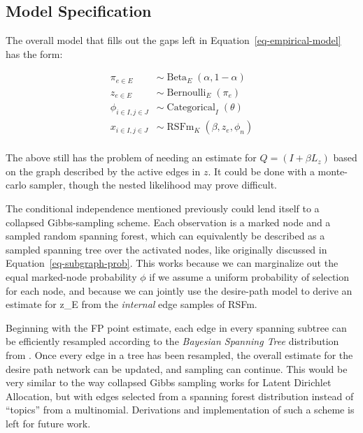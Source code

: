 \documentclass[%
	12pt,
		oneside,
		letterpaper
]{book}
\begin{document}
\subsection{Model Specification}\label{sec-lfa-gibbs}

The overall model that fills out the gaps left in
Equation~\ref{eq-empirical-model} has the form:

\[
\begin{aligned}
\pi_{e\in E} &\sim \operatorname{Beta}_E(\alpha, 1-\alpha)     \\
z_{e\in E} &\sim \operatorname{Bernoulli}_E(\pi_e)             \\
\phi_{i\in I, j\in J} &\sim \operatorname{Categorical}_I(\theta) \\
x_{i\in I,j\in J} &\sim \operatorname{RSFm}_K(\beta, z_e, \phi_n) \\
\end{aligned}
\]

The above still has the problem of needing an estimate for
\(Q=(I+\beta L_z)\) based on the graph described by the active edges in
\(z\). It could be done with a monte-carlo sampler, though the nested
likelihood may prove difficult.

The conditional independence mentioned previously could lend itself to a
collapsed Gibbs-sampling scheme. Each observation is a marked node and a
sampled random spanning forest, which can equivalently be described as a
sampled spanning tree over the activated nodes, like originally
discussed in Equation~\ref{eq-subgraph-prob}. This works because we can
marginalize out the equal marked-node probability \(\phi\) if we assume
a uniform probability of selection for each node, and because we can
jointly use the desire-path model to derive an estimate for z\_E from
the \emph{internal} edge samples of RSFm.

Beginning with the FP point estimate, each edge in every spanning
subtree can be efficiently resampled according to the \emph{Bayesian
Spanning Tree} distribution from
\textcite{BayesianSpanningTree_Duan2021}. Once every edge in a tree has
been resampled, the overall estimate for the desire path network can be
updated, and sampling can continue. This would be very similar to the
way collapsed Gibbs sampling works for Latent Dirichlet
Allocation\autocite{Latentdirichletallocation_Blei2003}, but with edges
selected from a spanning forest distribution instead of ``topics'' from
a multinomial. Derivations and implementation of such a scheme is left
for future work.
\end{document}
